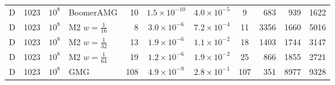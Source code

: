 \begin{longtable}{lrrlrcccrrr}
D & 1023 & $10^{8}$ & BoomerAMG & 10 & $1.5{\times}10^{-10}$ & $4.0{\times}10^{-5}$ & 9 & 683 & 939 & 1622 \\
D & 1023 & $10^{8}$ & M2 $w{=}\frac1{16}$ & 8 & $3.0{\times}10^{-6}$ & $7.2{\times}10^{-4}$ & 11 & 3356 & 1660 & 5016 \\
D & 1023 & $10^{8}$ & M2 $w{=}\frac1{32}$ & 13 & $1.9{\times}10^{-6}$ & $1.1{\times}10^{-2}$ & 18 & 1403 & 1744 & 3147 \\
D & 1023 & $10^{8}$ & M2 $w{=}\frac1{64}$ & 19 & $1.2{\times}10^{-6}$ & $1.9{\times}10^{-2}$ & 25 & 866 & 1855 & 2721 \\
D & 1023 & $10^{8}$ & GMG & 108 & $4.9{\times}10^{-9}$ & $2.8{\times}10^{-1}$ & 107 & 351 & 8977 & 9328 \\
\bottomrule
\end{longtable}
\endgroup